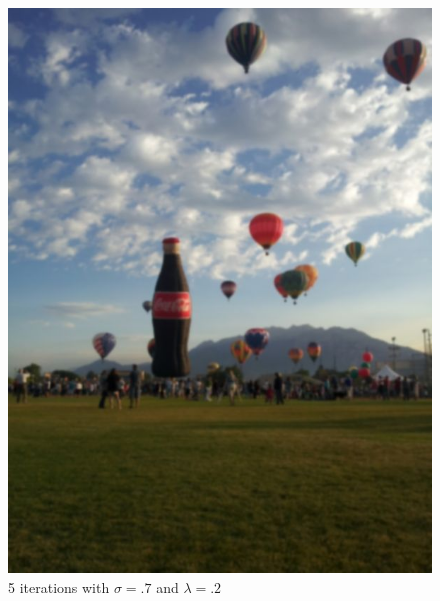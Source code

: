 \begin{figure}[ht]
\begin{minipage}[b]{0.45\linewidth}
\includegraphics[width=\textwidth]{baloon_resized_color_5.jpg}
\caption*{5 iterations with $\sigma = .7$ and $\lambda = .2$}
\end{minipage}
\begin{minipage}[b]{0.45\linewidth}
\centering

\end{minipage}
\end{figure}
